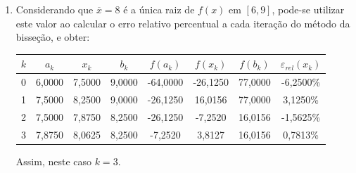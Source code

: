 \documentclass[12pt,a4paper]{article}
\begin{document}
\begin{enumerate}
\begin{enumerate}
\item Considerando que $\overline{x} = 8$ é a única raiz de $f(x)$ em $[6, 9]$, pode-se utilizar este valor ao calcular o erro relativo percentual a cada iteração do método da bisseção, e obter:

\begin{tabular}{cccccccc}
\hline
$k$ & $a_k$ & $x_k$ & $b_k$ & $f(a_k)$ & $f(x_k)$ & $f(b_k)$ & $\varepsilon_{rel}(x_k)$ \\
\hline
0 & 6,0000 & 7,5000 & 9,0000 & -64,0000 & -26,1250 & 77,0000 & -6,2500\%\\
1 & 7,5000 & 8,2500 & 9,0000 & -26,1250 &  16,0156 & 77,0000 &  3,1250\%\\
2 & 7,5000 & 7,8750 & 8,2500 & -26,1250 &  -7,2520 & 16,0156 & -1,5625\%\\
3 & 7,8750 & 8,0625 & 8,2500 &  -7,2520 &   3,8127 & 16,0156 &  0,7813\%\\
\hline
\end{tabular}

Assim, neste caso $k = 3$.
\end{enumerate}


\end{enumerate}
\end{document}
